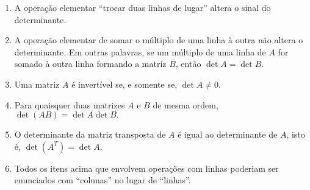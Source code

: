 \begin{teo}
\begin{enumerate}[$(i)$]
\item A operação elementar ``trocar duas linhas de lugar'' altera o sinal do determinante.

\item A operação elementar de somar o múltiplo de uma linha à outra não altera o determinante. Em outras palavras, se um múltiplo de uma linha de $A$ for somado à outra linha formando a matriz $B$, então $\det A = \det B$.

\item Uma matriz $A$ é invertível se, e somente se, $\det A \neq 0.$

\item Para quaisquer duas matrizes $A$ e $B$ de mesma ordem, $\det (AB) = \det A \det B.$

\item O determinante da matriz transposta de $A$ é igual ao determinante de $A$, isto é, $\det (A^T) = \det A.$

\item Todos os itens acima que envolvem operações com linhas poderiam ser enunciados com ``colunas'' no lugar de ``linhas''.
\end{enumerate}
\end{teo}

